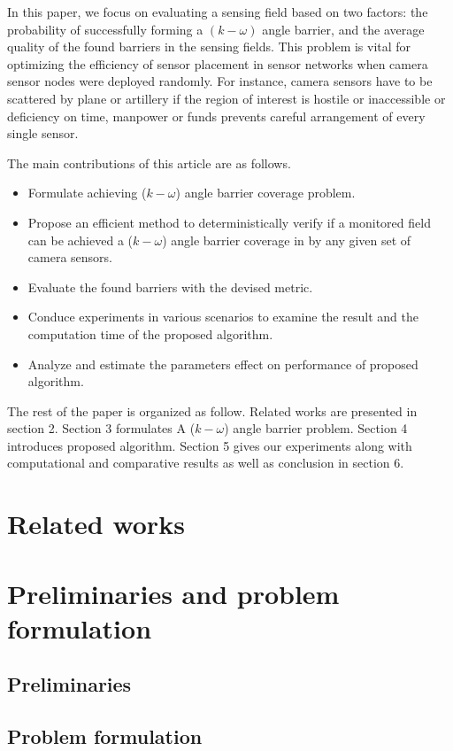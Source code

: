 \documentclass[3p]{elsarticle}
\begin{document}
%
In this paper, we focus on evaluating a sensing field based on two factors: the probability of successfully forming a $(k-\omega)$ angle barrier, and the average quality of the found barriers in the sensing fields. This problem is vital for optimizing the efficiency of sensor placement in sensor networks when camera sensor nodes were deployed randomly. For instance, camera sensors have to be scattered by plane or artillery if the region of interest is hostile or inaccessible or deficiency on time, manpower or funds prevents careful arrangement of every single sensor.\par
%
The main contributions of this article are as follows. 
\begin{itemize}
	\item Formulate achieving ($k-\omega$) angle barrier coverage problem.
	\item Propose an efficient method to deterministically verify if a monitored field can be achieved a ($k-\omega$) angle barrier coverage in by any given set of camera sensors. 
	\item Evaluate the found barriers with the devised metric.
	\item Conduce experiments in various scenarios to examine the result and the computation time of the proposed algorithm.
	\item Analyze and estimate the parameters effect on performance of proposed algorithm.
\end{itemize}
%
The rest of the paper is organized as follow. Related works are presented in section 2. Section 3 formulates A ($k-\omega$) angle barrier problem. Section 4 introduces proposed algorithm. Section 5 gives our experiments along with computational and comparative results as well as conclusion in section 6.
%

\section{Related works}


\section{Preliminaries and problem formulation}
\subsection{Preliminaries}


\subsection{Problem formulation}

\end{document}

